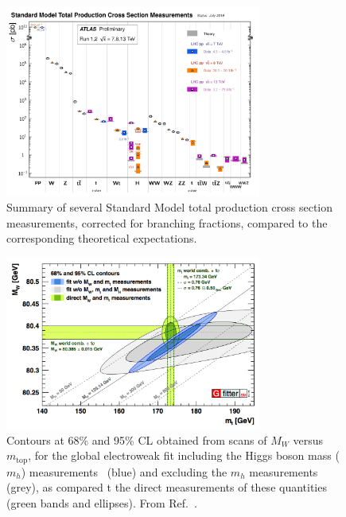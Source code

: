 \begin{figure}[!htb]
    \begin{center}
        \includegraphics[width=0.75\textwidth]{figures/chapter1/sm_final/sm_xsec_summary}
        \caption{
            Summary of several Standard Model total production cross section measurements,
            corrected for branching fractions, compared to the corresponding theoretical expectations. 
        }
        \label{fig:sm_xsec_summary}
    \end{center}
\end{figure}
\begin{figure}[!htb]
    \begin{center}
        \includegraphics[width=0.75\textwidth]{figures/chapter1/sm_final/mw_vs_mt_indirect}
        \caption{
            Contours at 68\% and 95\% CL obtained from scans of $M_W$ versus $m_{\text{top}}$,
            for the global electroweak fit including the Higgs boson mass ($m_h$) measurements~\cite{HMassATLAS,HMassCMS} (blue)
            and excluding the $m_h$ measurements (grey), as compared t the direct
            measurements of these quantities (green bands and ellipses).
            From Ref.~\cite{GFitter}.
        }
        \label{fig:mw_mt_scan}
    \end{center}
\end{figure}

